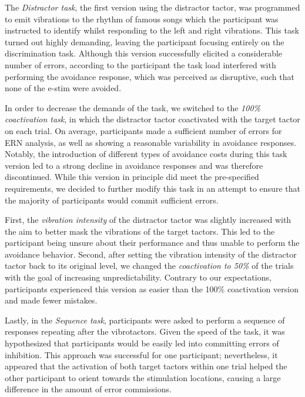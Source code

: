 \documentclass[twocolumn, serif, authordate, empirical]{jote-article}
\begin{document}
The \emph{Distractor task}, the first version using the distractor tactor, was programmed to emit vibrations to the rhythm of famous songs which the participant was instructed to identify whilst responding to the left and right vibrations. This task turned out highly demanding, leaving the participant focusing entirely on the discrimination task. Although this version successfully elicited a considerable number of errors, according to the participant the task load interfered with performing the avoidance response, which was perceived as disruptive, such that none of the e-stim were avoided.

In order to decrease the demands of the task, we switched to the \emph{100\% coactivation task}, in which the distractor tactor coactivated with the target tactor on each trial. On average, participants made a sufficient number of errors for ERN analysis, as well as showing a reasonable variability in avoidance responses. Notably, the introduction of different types of avoidance costs during this task version led to a strong decline in avoidance responses and was therefore discontinued. While this version in principle did meet the pre-specified requirements, we decided to further modify this task in an attempt to ensure that the majority of participants would commit sufficient errors.~

First, the \emph{vibration intensity} of the distractor tactor was slightly increased with the aim to better mask the vibrations of the target tactors. This led to the participant being unsure about their performance and thus unable to perform the avoidance behavior. Second, after setting the vibration intensity of the distractor tactor back to its original level, we changed the \emph{coactivation to 50\%} of the trials with the goal of increasing unpredictability. Contrary to our expectations, participants experienced this version as easier than the 100\% coactivation version and made fewer mistakes.

Lastly, in the \emph{Sequence task}, participants were asked to perform a sequence of responses repeating after the vibrotactors. Given the speed of the task, it was hypothesized that participants would be easily led into committing errors of inhibition. This approach was successful for one participant; nevertheless, it appeared that the activation of both target tactors within one trial helped the other participant to orient towards the stimulation locations, causing a large difference in the amount of error commissions.~
\end{document}
